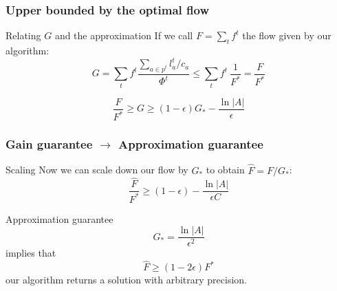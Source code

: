 \documentclass{beamer}
\begin{document}
\begin{frame}
    \frametitle{Upper bounded by the optimal flow}


    \begin{block}{Relating $G$ and the approximation}
    If we call $F = \sum_t f^t$ the flow given by our algorithm:
    \begin{equation*}
    G = \sum_t f^t \dfrac{\sum_{a \in p^t} l_a^t / c_a}{\Phi^t}
    \leq
    \sum_t f^t ~ \dfrac{1}{F^*}
    = \dfrac{F}{F^*} \label{approx-bound}
    \end{equation*}
    \end{block}

    \begin{equation*}
    \dfrac{F}{F^*} \geq G \geq (1 - \epsilon) G_* - \frac{\ln|A|}{\epsilon}
    \end{equation*}
\end{frame}

\begin{frame}
    \frametitle{Gain guarantee $\to$ Approximation guarantee}

    \begin{block}{Scaling}
    Now we can scale down our flow by $G_*$ to obtain $\hat{F} = F / G_*$:
    \begin{equation*}
    \dfrac{\hat{F}}{F^*} \geq (1 - \epsilon) - \frac{\ln|A|}{\epsilon C}
    \end{equation*}
    \end{block}

    \begin{block}{Approximation guarantee}
    \begin{equation*}
        G_* = \frac{\ln|A|}{\epsilon^2}
    \end{equation*}
    implies that
    \begin{equation*}
    \hat{F} \geq (1 - 2\epsilon) F^*
    \end{equation*}
    our algorithm returns a solution with arbitrary precision.
    \end{block}

\end{frame}
\end{document}
